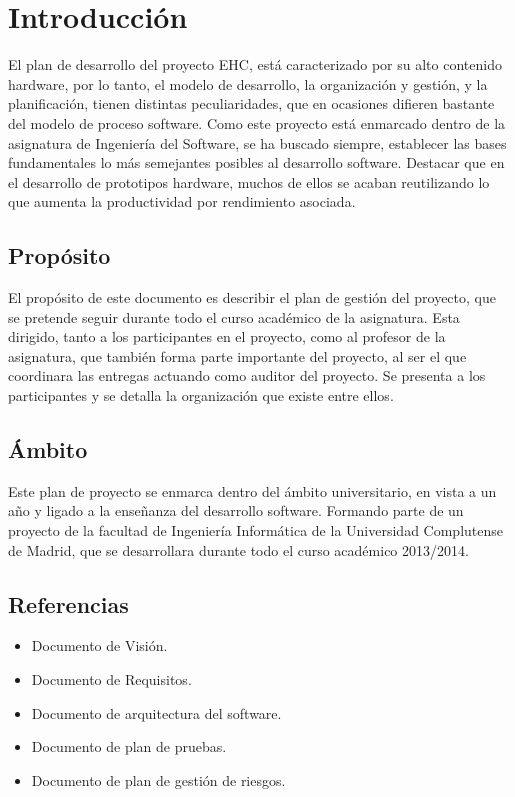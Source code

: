 \chapter{Introducción}
El plan de desarrollo del proyecto EHC, está caracterizado por su alto contenido hardware, por lo tanto, el modelo de desarrollo, la organización y gestión, y la planificación, tienen distintas peculiaridades, que en ocasiones difieren bastante del modelo de proceso software. Como este proyecto está enmarcado dentro de la asignatura de Ingeniería del Software, se ha buscado siempre, establecer las bases fundamentales lo más semejantes posibles al desarrollo software. Destacar que en el desarrollo de prototipos hardware, muchos de ellos se acaban reutilizando lo que aumenta la productividad por rendimiento asociada.
\section{Propósito}El propósito de este documento es describir el plan de gestión del proyecto, que se pretende seguir durante todo el curso académico de la asignatura. Esta dirigido, tanto a los participantes en el proyecto, como al profesor de la asignatura, que también forma parte importante del proyecto, al ser el que coordinara las entregas actuando como auditor del proyecto. Se presenta a los participantes y se detalla la organización que existe entre ellos.

\section{Ámbito}Este plan de proyecto se enmarca dentro del ámbito universitario, en vista a un año y ligado a la enseñanza del desarrollo software. Formando parte de un proyecto de la facultad de Ingeniería Informática de la Universidad Complutense de Madrid, que se desarrollara durante todo el curso académico 2013/2014.

\section{Referencias}
\begin{itemize}
\item	Documento de Visión. 
\item	Documento de Requisitos. 
\item	Documento de arquitectura del software. 
\item	Documento de plan de pruebas. 
\item	Documento de plan de gestión de riesgos. 

\end{itemize}
